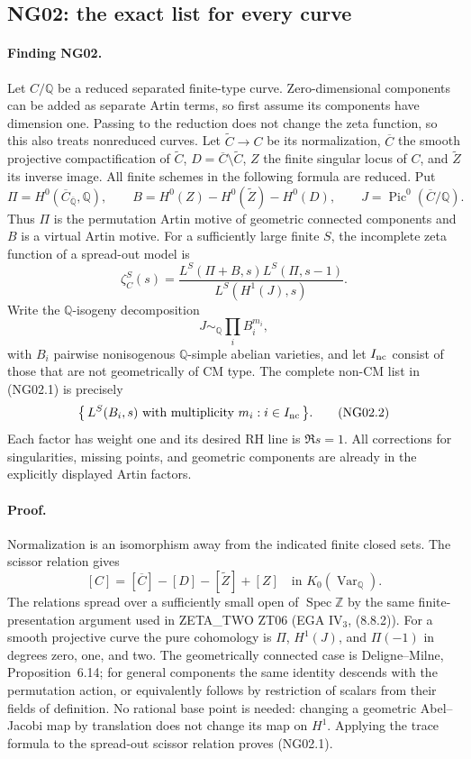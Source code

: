 \subsection{NG02: the exact list for every curve}
\label{NG02}

\paragraph{Finding NG02.}
Let $C/\mathbb Q$ be a reduced separated finite-type curve.  Zero-dimensional
components can be added as separate Artin terms, so first assume its
components have dimension one.  Passing to the reduction does not
change the zeta function, so this also treats nonreduced curves.
Let $\widetilde C\to C$ be its
normalization, $\overline C$ the smooth projective compactification of
$\widetilde C$, $D=\overline C\setminus\widetilde C$, $Z$ the finite
singular locus of $C$, and $\widetilde Z$ its inverse image.  All finite
schemes in the following formula are reduced.  Put
\[
 \Pi=H^0(\overline C_{\overline{\mathbb Q}},\mathbb Q),\qquad
 B=H^0(Z)-H^0(\widetilde Z)-H^0(D),\qquad
 J=\operatorname{Pic}^0(\overline C/\mathbb Q).
\]
Thus $\Pi$ is the permutation Artin motive of geometric connected
components and $B$ is a virtual Artin motive.  For a sufficiently
large finite $S$, the incomplete zeta function of a spread-out model is
\[
 \zeta^S_C(s)=
 \frac{L^S(\Pi+B,s)L^S(\Pi,s-1)}{L^S(H^1(J),s)}.             \tag{NG02.1}
\]
Write the $\mathbb Q$-isogeny decomposition
\[
                     J\sim_{\mathbb Q}\prod_i B_i^{m_i},
\]
with $B_i$ pairwise nonisogenous $\mathbb Q$-simple abelian varieties,
and let $I_{\rm nc}$ consist of those that are not geometrically of CM
type.  The complete non-CM list in (NG02.1) is precisely
\[
            \bigl\{\,L^S(B_i,s)\text{ with multiplicity }m_i:
                                i\in I_{\rm nc}\,\bigr\}.     \tag{NG02.2}
\]
Each factor has weight one and its desired RH line is $\Re s=1$.
All corrections for singularities, missing points, and geometric
components are already in the explicitly displayed Artin factors.

\paragraph{Proof.}
Normalization is an isomorphism away from the indicated finite closed
sets.  The scissor relation gives
\[
 [C]=[\overline C]-[D]-[\widetilde Z]+[Z]
                  \quad\text{in }K_0(\operatorname{Var}_{\mathbb Q}).
\]
The relations spread over a sufficiently small open of
$\operatorname{Spec}\mathbb Z$ by the same finite-presentation argument
used in ZETA\_TWO ZT06 (EGA IV$_3$, (8.8.2)).  For a smooth projective
curve the pure cohomology is $\Pi$, $H^1(J)$, and $\Pi(-1)$ in degrees
zero, one, and two.  The geometrically connected case is
Deligne--Milne, Proposition~6.14; for general components the same
identity descends with the permutation action, or equivalently follows
by restriction of scalars from their fields of definition.  No
rational base point is needed: changing a geometric Abel--Jacobi map
by translation does not change its map on $H^1$.  Applying
the trace formula to the spread-out scissor relation proves (NG02.1).

